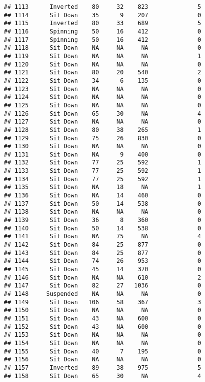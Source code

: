 \documentclass[
]{article}
\begin{document}
\begin{verbatim}
## 1113      Inverted    80     32    823              5
## 1114      Sit Down    35      9    207              0
## 1115      Inverted    80     33    689              5
## 1116      Spinning    50     16    412              0
## 1117      Spinning    50     16    412              0
## 1118      Sit Down    NA     NA     NA              0
## 1119      Sit Down    NA     NA     NA              1
## 1120      Sit Down    NA     NA     NA              0
## 1121      Sit Down    80     20    540              2
## 1122      Sit Down    34      6    135              0
## 1123      Sit Down    NA     NA     NA              0
## 1124      Sit Down    NA     NA     NA              0
## 1125      Sit Down    NA     NA     NA              0
## 1126      Sit Down    65     30     NA              4
## 1127      Sit Down    NA     NA     NA              0
## 1128      Sit Down    80     38    265              1
## 1129      Sit Down    75     26    830              0
## 1130      Sit Down    NA     NA     NA              0
## 1131      Sit Down    NA      9    400              0
## 1132      Sit Down    77     25    592              1
## 1133      Sit Down    77     25    592              1
## 1134      Sit Down    77     25    592              1
## 1135      Sit Down    NA     18     NA              1
## 1136      Sit Down    NA     14    460              0
## 1137      Sit Down    50     14    538              0
## 1138      Sit Down    NA     NA     NA              0
## 1139      Sit Down    36      8    360              0
## 1140      Sit Down    50     14    538              0
## 1141      Sit Down    NA     75     NA              4
## 1142      Sit Down    84     25    877              0
## 1143      Sit Down    84     25    877              0
## 1144      Sit Down    74     26    953              0
## 1145      Sit Down    45     14    370              0
## 1146      Sit Down    NA     NA    610              2
## 1147      Sit Down    82     27   1036              0
## 1148     Suspended    NA     NA     NA              0
## 1149      Sit Down   106     58    367              3
## 1150      Sit Down    NA     NA     NA              0
## 1151      Sit Down    43     NA    600              0
## 1152      Sit Down    43     NA    600              0
## 1153      Sit Down    NA     NA     NA              0
## 1154      Sit Down    NA     NA     NA              0
## 1155      Sit Down    40      7    195              0
## 1156      Sit Down    NA     NA     NA              0
## 1157      Inverted    89     38    975              5
## 1158      Sit Down    65     30     NA              4

\end{verbatim}
\end{document}
